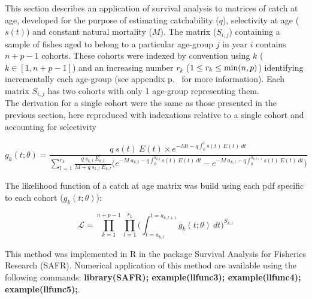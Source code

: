 This section describes an application of survival analysis to matrices of catch at age, developed for the purpose of estimating catchability ($q$), selectivity at age ($s(t)$) and constant natural mortality ($M$). The matrix ($S_{i,j}$) containing a sample of fishes aged to belong to a particular age-group $j$ in year $i$ contains $n+p-1$ cohorts. These cohorts were indexed by convention using $k$ ($k \in [1, n+p-1]$) and an increasing number $r_{k}$ ($ 1 \leq r_{k} \leq {\rm min}(n,p)$) identifying incrementally each age-group (see appendix p.~\pageref{Appendix:DefinitionsOfMathematicalSymbols} for more information). Each matrix $S_{i,j}$ has two cohorts with only 1 age-group representing them.\\

The derivation for a single cohort were the same as those presented in the previous section, here reproduced with indexations relative to a single cohort and accounting for selectivity

\begin{equation}
g_{k}(t; \theta) = \frac{q \ s(t) \ E(t) \times e^{-Mt-q\int_{0}^{t} s(t) \ E(t) \ dt}}{\sum_{l=1}^{r_{k}} \frac{q \ s_{k,l} \ E_{k,l}}{M+q \ s_{k,l} \ E_{k,l}} \bigl ( e^{-M \ a_{k,l}-q\int_{0}^{a_{k,l}}s(t) \ E(t) \ dt} - e^{-M \ a_{k,l}-q\int_{0}^{a_{k,l+1}}s(t) \ E(t) \ dt} \bigr )} 
\end{equation}

The likelihood function of a catch at age matrix was build using each pdf specific to each cohort ($g_{k}(t; \theta)$):

\begin{equation}
\mathcal{L} = \prod_{k=1}^{n+p-1} \prod_{l=1}^{r_{k}}  \bigl ( \int_{t=a_{k,l}}^{t=a_{k,l+1}} g_{k}(t; \theta) \ dt \bigr ) ^ {S_{k,l}}
\end{equation}

This method was implemented in R \citep{R} in the package Survival Analysis for Fisheries Research (SAFR). Numerical application of this method are available using the following commands: {\bf library(SAFR); example(llfunc3); example(llfunc4); example(llfunc5);}.\\
